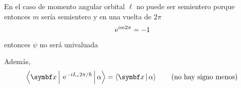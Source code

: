 \documentclass[10pt,oneside]{CBFT_book}
\begin{document}
En el caso de momento angular orbital $\ell$ no puede ser semientero porque entonces $m$ sería semientero y 
en una vuelta de $2\pi$
\[
	\:\mathrm{e}^{im2\pi} = -1
\]
entonces $\psi$ no será univaluada

Además,
\[
	\Braket{\vb{x}|\euler^{-iL_z2\pi/\hbar}|\alpha} = \Braket{\vb{x}|\alpha} \qquad \text{(no hay signo menos)}
\]


\end{document}
